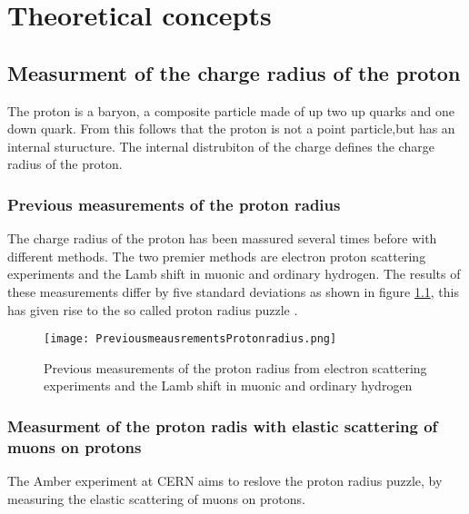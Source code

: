 \chapter{Theoretical concepts}\label{cha:theory}


\section{Measurment of the charge radius of the proton}\label{sec:proton_radius}
The proton is a baryon, a composite particle made of up two up quarks and one down quark.
From this follows that the proton is not a point particle,but has an internal sturucture.
The internal  distrubiton of the charge defines the charge radius of the proton.
\subsection{Previous measurements of the proton radius}
The charge radius of the proton has been massured several times before with different methods.
The two premier methods are electron proton scattering experiments and the Lamb shift in muonic and ordinary hydrogen.
The results of these measurements differ by five standard deviations as shown in figure \ref{fig:previous_proton_radius},
this has given rise to the so called proton radius puzzle \autocite{ProposalAmber}.
\begin{figure}[H]
	\centering
	\texttt{[image: PreviousmeausrementsProtonradius.png]}
	\caption{Previous measurements of the proton radius from electron scattering experiments and the Lamb shift in muonic and ordinary hydrogen \autocite{ProposalAmber} }
	\label{fig:previous_proton_radius}
\end{figure}






\subsection{Measurment of the proton radis with elastic scattering of muons on protons}
The Amber experiment at CERN aims to reslove the proton radius puzzle, by measuring the elastic scattering of muons on protons.

